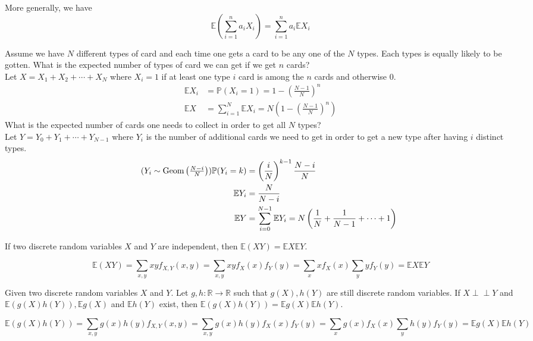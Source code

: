 \documentclass{huhtakm-template-book}
\newcommand{\independent}{\perp\!\!\!\perp}
\newcommand{\prob}{\mathbb{P}}
\newcommand{\expect}{\mathbb{E}}
\DeclareMathOperator{\Geom}{Geom}
\begin{document}
\begin{rem}
	More generally, we have
	\begin{equation*}
		\expect\left(\sum_{i=1}^{n}a_{i}X_{i}\right)=\sum_{i=1}^{n}a_{i}\expect X_{i}
	\end{equation*}
\end{rem}
\begin{eg}
	Assume we have $N$ different types of card and each time one gets a card to be any one of the $N$ types. Each types is equally likely to be gotten. What is the expected number of types of card we can get if we get $n$ cards?\\
	Let $X=X_{1}+X_{2}+\cdots+X_{N}$ where $X_{i}=1$ if at least one type $i$ card is among the $n$ cards and otherwise $0$.
	\begin{align*}
		\expect X_{i}&=\prob(X_{i}=1)=1-\left(\frac{N-1}{N}\right)^{n}\\
		\expect X&=\sum_{i=1}^{N}\expect X_{i}=N\left(1-\left(\frac{N-1}{N}\right)^{n}\right)
	\end{align*}
	What is the expected number of cards one needs to collect in order to get all $N$ types?\\
	Let $Y=Y_{0}+Y_{1}+\cdots+Y_{N-1}$ where $Y_{i}$ is the number of additional cards we need to get in order to get a new type after having $i$ distinct types.
	\begin{align*}
		\tag{$Y_{i}\sim\Geom\left(\frac{N-i}{N}\right)$}
		\prob(Y_{i}=k)&=\left(\frac{i}{N}\right)^{k-1}\frac{N-i}{N}\\
		\expect Y_{i}&=\frac{N}{N-i}\\
		\expect Y&=\sum_{i=0}^{N-1}\expect Y_{i}=N\left(\frac{1}{N}+\frac{1}{N-1}+\cdots+1\right)
	\end{align*}
\end{eg}
\begin{lem}
	If two discrete random variables $X$ and $Y$ are independent, then $\expect(XY)=\expect X\expect Y$.
\end{lem}
\begin{proofing}
	\begin{equation*}
		\expect(XY)=\sum_{x,y}xyf_{X,Y}(x,y)=\sum_{x,y}xyf_{X}(x)f_{Y}(y)=\sum_{x}xf_{X}(x)\sum_{y}yf_{Y}(y)=\expect X\expect Y
	\end{equation*}
\end{proofing}
\begin{lem}
	Given two discrete random variables $X$ and $Y$. Let $g,h:\mathbb{R}\to\mathbb{R}$ such that $g(X),h(Y)$ are still discrete random variables. If $X\independent Y$ and $\expect(g(X)h(Y)),\expect g(X)$ and $\expect h(Y)$ exist, then $\expect(g(X)h(Y))=\expect g(X)\expect h(Y)$.
\end{lem}
\begin{proofing}
	\begin{equation*}
		\expect(g(X)h(Y))=\sum_{x,y}g(x)h(y)f_{X,Y}(x,y)=\sum_{x,y}g(x)h(y)f_{X}(x)f_{Y}(y)=\sum_{x}g(x)f_{X}(x)\sum_{y}h(y)f_{Y}(y)=\expect g(X)\expect h(Y)
	\end{equation*}
\end{proofing}
\end{document}
